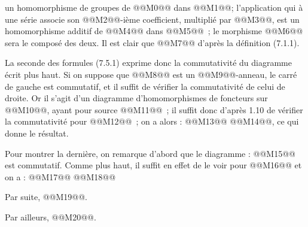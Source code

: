 
un homomorphisme de groupes de @@M0@@ dans @@M1@@; l'application qui à une série associe son @@M2@@-ième coefficient, multiplié par @@M3@@, est un homomorphisme additif de @@M4@@ dans @@M5@@~; le morphisme @@M6@@ sera le composé des deux. Il est clair que @@M7@@ d'après la définition (7.1.1).

La seconde des formules (7.5.1) exprime donc la commutativité du diagramme écrit plus haut. Si on suppose que @@M8@@ est un @@M9@@-anneau, le carré de gauche est commutatif, et il suffit de vérifier la commutativité de celui de droite. Or il s'agit d'un diagramme d'homomorphismes de foncteurs sur @@M10@@, ayant pour source @@M11@@~; il suffit donc d'après 1.10 de vérifier la commutativité pour @@M12@@~; on a alors :
@@M13@@
@@M14@@, ce qui donne le résultat.

Pour montrer la dernière, on remarque d'abord que le diagramme :
@@M15@@
est commutatif. Comme plus haut, il suffit en effet de le voir pour @@M16@@ et on a :
@@M17@@
@@M18@@

Par suite, @@M19@@.

Par ailleurs, @@M20@@.
